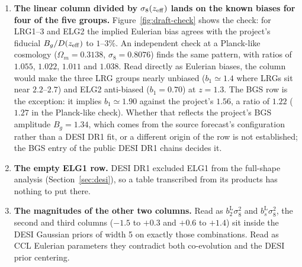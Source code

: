 \documentclass[11pt]{article}
\newcommand{\bone}{b_1}            %
\newcommand{\btwoL}{b_2^{\mathrm{L}}}
\newcommand{\bsL}{b_s^{\mathrm{L}}}
\begin{document}
\begin{enumerate}
\item \textbf{The linear column divided by $\sigma_8(z_{\rm eff})$
lands on the known biases for four of the five groups.}
Figure~\ref{fig:draft-check} shows the check: for LRG1--3 and ELG2 the
implied Eulerian bias agrees with the project's fiducial
$B_g/D(z_{\rm eff})$ to $1$--$3\%$.  An independent check at a
Planck-like cosmology ($\Omega_m = 0.3138$, $\sigma_8 = 0.8076$) finds
the same pattern, with ratios of $1.055$, $1.022$, $1.011$ and $1.038$.
Read directly as Eulerian biases, the column would make the three LRG
groups nearly unbiased ($\bone \simeq 1.4$ where LRGs sit near
$2.2$--$2.7$) and ELG2 anti-biased ($\bone = 0.70$) at $z = 1.3$.  The
BGS row is the exception: it implies $\bone \simeq 1.90$ against the
project's $1.56$, a ratio of $1.22$ ($1.27$ in the Planck-like check).
Whether that reflects the project's BGS amplitude $B_g = 1.34$, which
comes from the source forecast's configuration rather than a DESI DR1
fit, or a different origin of the row is not established; the BGS
entry of the public DESI DR1 chains decides it.
\item \textbf{The empty ELG1 row.}  DESI DR1 excluded ELG1 from the
full-shape analysis (Section~\ref{sec:desi}), so a table transcribed
from its products has nothing to put there.
\item \textbf{The magnitudes of the other two columns.}  Read as
$\btwoL\sigma_8^2$ and $\bsL\sigma_8^2$, the second and third columns
($-1.5$ to $+0.3$ and $+0.6$ to $+1.4$) sit inside the DESI Gaussian
priors of width 5 on exactly those combinations.  Read as CCL Eulerian
parameters they contradict both co-evolution and the DESI prior
centering.
\end{enumerate}
\end{document}
